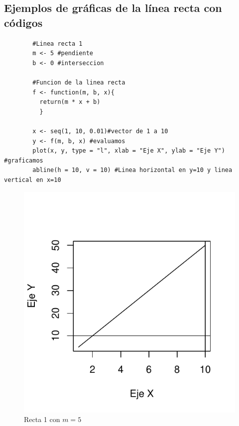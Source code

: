 \documentclass[12pt,a4paper]{article}
\begin{document}
\subsection{Ejemplos de gráficas de la línea recta con códigos} \label{subsec:ELR}
\begin{table}[htpb]
	\begin{lstlisting}
		#Linea recta 1
		m <- 5 #pendiente
		b <- 0 #interseccion
		
		#Funcion de la linea recta
		f <- function(m, b, x){
		  return(m * x + b)
		  }
		
		x <- seq(1, 10, 0.01)#vector de 1 a 10
		y <- f(m, b, x) #evaluamos
		plot(x, y, type = "l", xlab = "Eje X", ylab = "Eje Y") #graficamos
		abline(h = 10, v = 10) #Linea horizontal en y=10 y linea vertical en x=10
	\end{lstlisting}
	\caption{Primer código en R para gráficar la recta de la figura \ref{fig:recta1}.}
	\label{alg:recta1}
\end{table}
\begin{figure}
\centering
\includegraphics[scale=.8]{LR1}
\caption{Recta 1 con $ m = 5 $}
\label{fig:recta1}
\end{figure}
\end{document}

